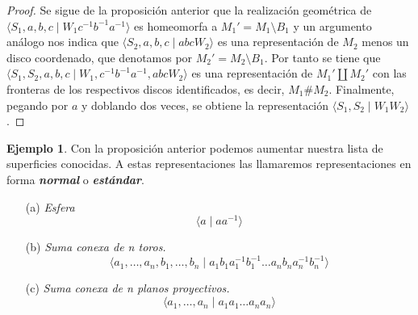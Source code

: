 \documentclass[10pt]{report}
\newcommand{\enfatiza}[1]{\textbf{\textit{#1}}}
\theoremstyle{definition}
\newtheorem{eje}[defin]{Ejemplo}
\begin{document}
\begin{proof}
Se sigue de la proposición anterior que la realización geométrica de $\langle S_1,a,b,c\mid W_1c^{-1}b^{-1}a^{-1}\rangle$ es homeomorfa a $M_1'=M_1\setminus B_1$ y un argumento análogo nos indica que $\langle S_2,a,b,c\mid abcW_2\rangle$ es una representación de $M_2$ menos un disco coordenado, que denotamos por $M_2'=M_2\setminus B_1$. Por tanto se tiene que $\langle S_1,S_2,a,b,c\mid W_1,c^{-1}b^{-1}a^{-1},abcW_2\rangle$ es una representación de $M_1'\amalg M_2'$ con las fronteras de los respectivos discos identificados, es decir, $M_1\# M_2$. Finalmente, pegando por $a$ y doblando dos veces, se obtiene la representación $\langle S_1,S_2\mid W_1W_2\rangle$.
\end{proof}



\begin{eje}
Con la proposición anterior podemos aumentar nuestra lista de superficies conocidas. A estas representaciones las llamaremos representaciones en forma \enfatiza{normal} o \enfatiza{estándar}.
\begin{itemize}
\item [(a)] \textit{Esfera} 
$$\langle a \mid aa^{-1} \rangle$$
\item[(b)] \textit{Suma conexa de n toros.}
$$\langle a_1,\dots ,a_n, b_1,\dots ,b_n\mid a_1b_1a_1^{-1}b_1^{-1}\dots a_nb_na_n^{-1}b_n^{-1}\rangle$$ 
\item[(c)] \textit{Suma conexa de n planos proyectivos.} 
$$\langle a_1,\dots ,a_n\mid a_1a_1\dots a_na_n\rangle$$
\end{itemize}
\end{eje}
\end{document}
